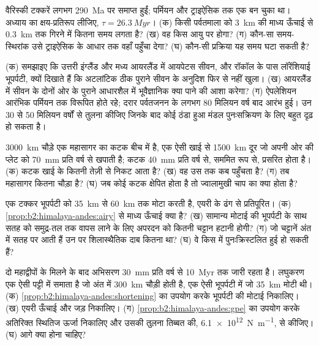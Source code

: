 \begin{exercise}[$\star\star$]\label{exo:b2:wilson-cycle:8}
वैरिस्की टक्करें लगभग \qty{290}{Ma} पर समाप्त हुईं; पर्मियन और
ट्राइऐसिक तक एक  बन चुका था। अध्याय का क्षय-प्रतिरूप लीजिए, $\tau = \qty{26.3}{Myr}$। (क) किसी
पर्वतमाला को \qty{3}{km} की माध्य ऊँचाई से \qty{0.3}{km} तक गिरने में कितना समय लगता है? (ख) वह किस आयु पर
होगा? (ग) कौन-सा समय-स्थिरांक उसे ट्राइऐसिक के आधार तक वहाँ पहुँचा देगा? (घ) कौन-सी
प्रक्रिया यह समय घटा सकती है?
\end{exercise}

\begin{exercise}[$\star\star$]\label{exo:b2:wilson-cycle:9}
(क) समझाइए कि उत्तरी इंग्लैंड और मध्य आयरलैंड में आयपेटस सीवन, और रॉकॉल के पास लॉरेंशियाई
भूपर्पटी, क्यों दिखाते हैं कि अटलांटिक ठीक पुराने सीवन के अनुदिश फिर से नहीं खुला।
(ख) आयरलैंड में सीवन के दोनों ओर के पुराने आधारशैल में भूवैज्ञानिक क्या पाने की आशा करेगा?
(ग) ऐपलेशियन आरंभिक पर्मियन तक विरूपित होते रहे; दरार पर्वतजनन के
लगभग 80 मिलियन वर्ष बाद आरंभ हुई। उन 30 से 50 मिलियन वर्षों से तुलना कीजिए जिनके बाद
कोई ठंडा हुआ मंडल पुनःसक्रियण के लिए बहुत दृढ़ हो सकता है।
\end{exercise}

\begin{exercise}[$\star\star\star$]\label{exo:b2:wilson-cycle:10}
\qty{3000}{km} चौड़े एक महासागर का कटक बीच में है, एक ऐसी खाई से \qty{1500}{km} दूर जो
अपनी ओर की प्लेट को \qty{70}{mm} प्रति वर्ष से खपाती है; कटक \qty{40}{mm} प्रति
वर्ष से, सममित रूप से, प्रसरित होता है। (क) कटक खाई के कितनी तेज़ी से निकट आता है? (ख) वह उस तक कब
पहुँचता है? (ग) तब महासागर कितना चौड़ा है? (घ) जब कोई कटक क्षेपित होता है तो ज्वालामुखी चाप का
क्या होता है?
\end{exercise}

\begin{exercise}[$\star\star\star$]\label{exo:b2:wilson-cycle:11}
एक टक्कर भूपर्पटी को \qty{35}{km} से \qty{60}{km} तक मोटा करती है, एयरी के ढंग से प्रतिपूरित।
(क) \cref{prop:b2:himalaya-andes:airy} से माध्य ऊँचाई क्या है? (ख) सामान्य मोटाई की भूपर्पटी के साथ
सतह को समुद्र-तल तक वापस लाने के लिए अपरदन को कितनी चट्टान हटानी होगी?
(ग) जो चट्टानें अंत में सतह पर आती हैं उन पर शिलास्थैतिक दाब कितना था? (घ) वे किस
 में पुनःक्रिस्टलित हुई हो सकती हैं?
\end{exercise}

\begin{exercise}[$\star\star\star$]\label{exo:b2:wilson-cycle:12}
दो महाद्वीपों के मिलने के बाद अभिसरण \qty{30}{mm} प्रति वर्ष से \qty{10}{Myr} तक जारी रहता है।
लघुकरण एक ऐसी पट्टी में समाता है जो अंत में \qty{300}{km} चौड़ी होती है, एक ऐसी भूपर्पटी में जो
\qty{35}{km} मोटी थी। (क) \cref{prop:b2:himalaya-andes:shortening} का उपयोग करके भूपर्पटी की
मोटाई निकालिए। (ख) एयरी ऊँचाई और जड़ निकालिए। (ग) \cref{prop:b2:himalaya-andes:gpe} का उपयोग करके
अतिरिक्त स्थितिज ऊर्जा निकालिए और उसकी तुलना तिब्बत की, \qty{6.1e12}{N.m^{-1}}, से कीजिए।
(घ) आगे क्या होना चाहिए?
\end{exercise}

